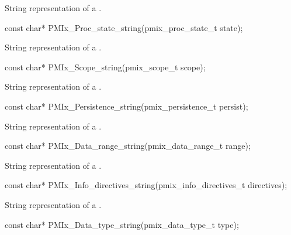 \summary
{}

String representation of a .

\cspecificstart
\begin{codepar}
const char*
PMIx_Proc_state_string(pmix_proc_state_t state);
\end{codepar}
\cspecificend

\summary
{}

String representation of a .

\cspecificstart
\begin{codepar}
const char*
PMIx_Scope_string(pmix_scope_t scope);
\end{codepar}
\cspecificend

\summary
{}

String representation of a .

\cspecificstart
\begin{codepar}
const char*
PMIx_Persistence_string(pmix_persistence_t persist);
\end{codepar}
\cspecificend

\summary
{}

String representation of a .

\cspecificstart
\begin{codepar}
const char*
PMIx_Data_range_string(pmix_data_range_t range);
\end{codepar}
\cspecificend

\summary
{}

String representation of a .

\cspecificstart
\begin{codepar}
const char*
PMIx_Info_directives_string(pmix_info_directives_t directives);
\end{codepar}
\cspecificend

\summary
{}

String representation of a .

\cspecificstart
\begin{codepar}
const char*
PMIx_Data_type_string(pmix_data_type_t type);
\end{codepar}
\cspecificend

